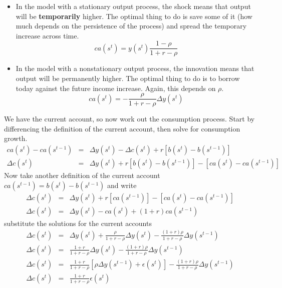 \documentclass[11pt,pdftex,twoside,letterpaper]{exam}
\begin{document}
\begin{itemize}
  \item In the model with a stationary output process, the shock means that output will be \textbf{temporarily} higher. The optimal thing to do is save some of it (how much depends on the persistence of the process) and spread the temporary increase across time.
      \[
      ca(s^t)  = y(s^{t}) \frac{1-\rho}{1+r-\rho}
      \]
  \item In the model with a nonstationary output process, the innovation means that output will be permanently higher. The optimal thing to do is to borrow today against the future income increase. Again, this depends on $\rho$.
      \[
      ca(s^t) = - \frac{\rho }{1+r-\rho}\Delta y(s^t)
      \]
\end{itemize}
We have the current account, so now work out the consumption process. Start by differencing the definition of the current account, then solve for consumption growth.
\begin{eqnarray}
  ca(s^t)-ca(s^{t-1}) &=& \Delta y(s^t)-\Delta c(s^t)+r\left[b(s^t)-b(s^{t-1})\right]\\
   \Delta c(s^t) &=& \Delta y(s^t)+r\left[b(s^t)-b(s^{t-1})\right]-\left[ca(s^t)-ca(s^{t-1})\right]
\end{eqnarray}
Now take another definition of the current account $ca(s^{t-1})=b(s^{t})-b(s^{t-1})$ and write
\begin{eqnarray}
  \Delta c(s^t) &=& \Delta y(s^t)+r\left[ca(s^{t-1})\right]-\left[ca(s^t)-ca(s^{t-1})\right]\\
  \Delta c(s^t) &=& \Delta y(s^t)-ca(s^{t}) + (1+ r) ca(s^{t-1})
\end{eqnarray}
substitute the solutions for the current accounts
\begin{eqnarray}
  \Delta c(s^t) &=& \Delta y(s^t)+\frac{\rho}{1+r-\rho}\Delta y(s^t) - \frac{(1+r)\rho}{1+r-\rho}\Delta y(s^{t-1})\\
  \Delta c(s^t) &=& \frac{1+r}{1+r-\rho}\Delta y(s^t) - \frac{(1+r)\rho}{1+r-\rho}\Delta y(s^{t-1}) \\
  \Delta c(s^t) &=& \frac{1+r}{1+r-\rho} \left[\rho \Delta y(s^{t-1}) + \epsilon(s^t) \right] - \frac{(1+r)\rho}{1+r-\rho}\Delta y(s^{t-1})\\
  \Delta c(s^t) &=& \frac{1+r}{1+r-\rho}\epsilon(s^t) \label{eq:cons-nonstationary}
\end{eqnarray}
\end{document}
